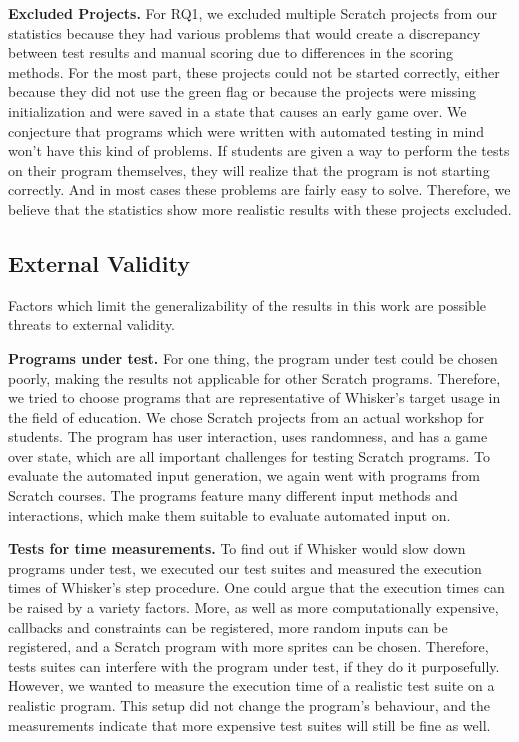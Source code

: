 \textbf{Excluded Projects.}
For RQ1, we excluded multiple Scratch projects from our statistics because they had various problems that
would create a discrepancy between test results and manual scoring due to differences in the scoring methods.
For the most part, these projects could not be started correctly,
either because they did not use the green flag or because the projects were missing initialization and were
saved in a state that causes an early game over.
We conjecture that programs which were written with automated testing in mind won't have this kind of problems.
If students are given a way to perform the tests on their program themselves, they will realize that the program is not starting correctly.
And in most cases these problems are fairly easy to solve.
Therefore, we believe that the statistics show more realistic results with these projects excluded.

\subsection{External Validity}

Factors which limit the generalizability of the results in this work are possible threats to external validity.
\parspace

\textbf{Programs under test.} For one thing, the program under test could be chosen poorly,
making the results not applicable for other Scratch programs.
Therefore, we tried to choose programs that are representative of Whisker's target usage in the field of education.
We chose Scratch projects from an actual workshop for students.
The program has user interaction, uses randomness, and has a game over state,
which are all important challenges for testing Scratch programs.
To evaluate the automated input generation,
we again went with programs from Scratch courses.
The programs feature many different input methods and interactions,
which make them suitable to evaluate automated input on.
\parspace

\textbf{Tests for time measurements.}
To find out if Whisker would slow down programs under test,
we executed our test suites and measured the execution times of Whisker's step procedure.
One could argue that the execution times can be raised by a variety factors.
More, as well as more computationally expensive, callbacks and constraints can be registered,
more random inputs can be registered,
and a Scratch program with more sprites can be chosen.
Therefore, tests suites can interfere with the program under test, if they do it purposefully.
However, we wanted to measure the execution time of a realistic test suite on a realistic program.
This setup did not change the program's behaviour,
and the measurements indicate that more expensive test suites will still be fine as well.
%
